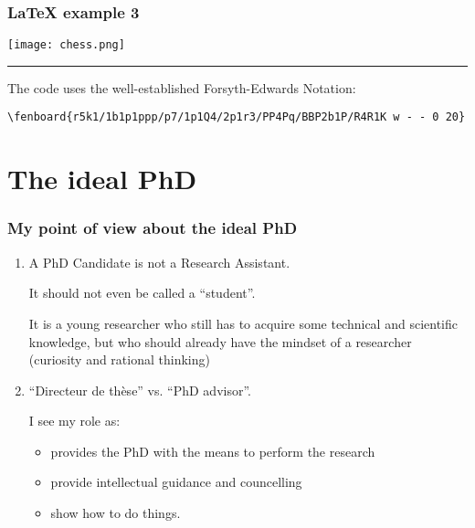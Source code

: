 \documentclass{beamer}
\newcounter{saveenumi}
\newcommand{\seti}{\setcounter{saveenumi}{\value{enumi}}}
\begin{document}
\begin{frame}[fragile]
\frametitle{LaTeX example 3}

\begin{center}
\texttt{[image: chess.png]}
\end{center}

\vspace*{1cm}

\hrule

\fontsize{6pt}{7}\selectfont

The code uses the well-established Forsyth-Edwards Notation:

\begin{verbatim}
\fenboard{r5k1/1b1p1ppp/p7/1p1Q4/2p1r3/PP4Pq/BBP2b1P/R4R1K w - - 0 20}
\end{verbatim}

\end{frame}

\begin{frame}[fragile]
\end{frame}


\section{The ideal PhD}

\begin{frame}[<+->]
\frametitle{My point of view about the ideal  PhD}

\addtolength{\itemsep}{2\baselineskip}

\begin{enumerate}
\item A PhD Candidate is not a Research Assistant.

  {\small 
    It should not even be called a ``student''. 

    It is a young researcher who still has to acquire some technical
    and scientific knowledge, but who should already have the mindset
    of a researcher (curiosity and rational thinking)}

\item ``Directeur de th\`ese'' vs. ``PhD advisor''.

I see my role as:

  {\small
  \begin{itemize}
  \item provides the PhD with the means to perform the research
  \item provide intellectual guidance and councelling
  \item show how to do things.
  \end{itemize}
  }
\seti
\end{enumerate}
\end{frame}
\end{document}
